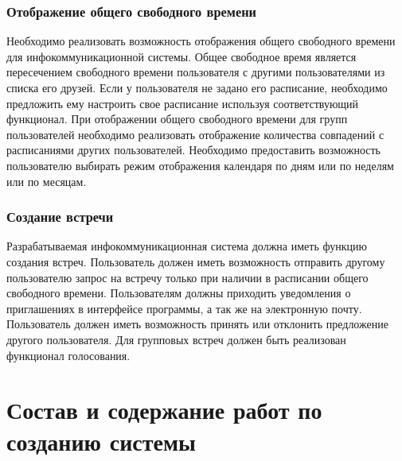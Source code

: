 \documentclass[14pt]{extreport}
\begin{document}
            \subsubsection{Отображение общего свободного времени}
                Необходимо реализовать возможность отображения общего свободного времени для инфокоммуникационной системы. Общее свободное время является пересечением свободного времени пользователя с другими пользователями из списка его друзей. Если у пользователя не задано его расписание, необходимо предложить ему настроить свое расписание используя соответствующий функционал. При отображении общего свободного времени для групп пользователей необходимо реализовать отображение количества совпадений с расписаниями других пользователей. Необходимо предоставить возможность пользователю выбирать режим отображения календаря по дням или по неделям или по месяцам. 
                
            \subsubsection{Создание встречи}

                Разрабатываемая инфокоммуникационная система должна иметь функцию создания встреч. Пользователь должен иметь возможность отправить другому пользователю запрос на встречу только при наличии в расписании общего свободного времени. Пользователям должны приходить уведомления о приглашениях в интерфейсе программы, а так же на электронную почту. Пользователь должен иметь возможность принять или отклонить предложение другого пользователя. Для групповых встреч должен быть реализован функционал голосования. 



\section{Состав и содержание работ по созданию системы}
\end{document}
